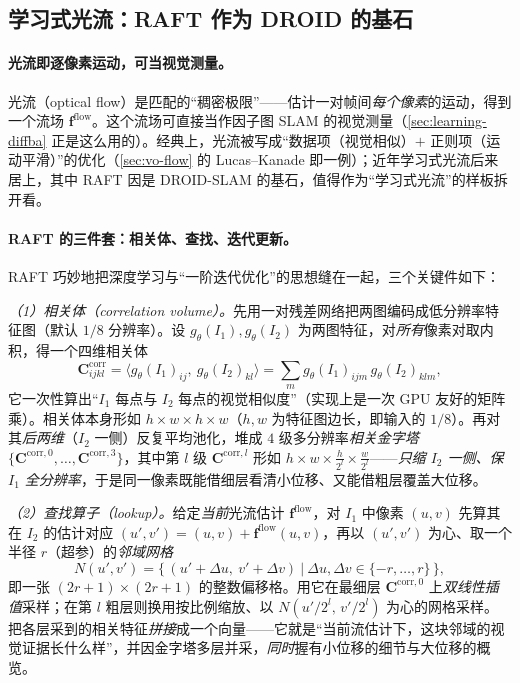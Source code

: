 \subsection{学习式光流：RAFT 作为 DROID 的基石}
\label{sec:learning-flow}

\paragraph{光流即逐像素运动，可当视觉测量。}
光流（optical flow）是匹配的“稠密极限”——估计一对帧间\emph{每个像素}的运动，得到一个流场 $\mathbf{f}^{\mathrm{flow}}$。这个流场可直接当作因子图 SLAM 的视觉测量（\cref{sec:learning-diffba} 正是这么用的）。经典上，光流被写成“数据项（视觉相似）$+$ 正则项（运动平滑）”的优化（\cref{sec:vo-flow} 的 Lucas--Kanade 即一例）；近年学习式光流后来居上，其中 RAFT\cite{teed2020raft} 因是 DROID-SLAM 的基石，值得作为“学习式光流”的样板拆开看。

\paragraph{RAFT 的三件套：相关体、查找、迭代更新。}
RAFT 巧妙地把深度学习与“一阶迭代优化”的思想缝在一起，三个关键件如下\cite{teed2020raft}：

\emph{（1）相关体（correlation volume）。}\;先用一对残差网络把两图编码成低分辨率特征图（默认 $1/8$ 分辨率）。设 $g_\theta(I_1),g_\theta(I_2)$ 为两图特征，对\emph{所有}像素对取内积，得一个四维相关体
\begin{equation}
  \mathbf{C}^{\mathrm{corr}}_{ijkl}
  =\big\langle g_\theta(I_1)_{ij},\ g_\theta(I_2)_{kl}\big\rangle
  =\sum_m g_\theta(I_1)_{ijm}\,g_\theta(I_2)_{klm},
  \label{eq:learn-raft-corr}
\end{equation}
它一次性算出“$I_1$ 每点与 $I_2$ 每点的视觉相似度”（实现上是一次 GPU 友好的矩阵乘）。相关体本身形如 $h\times w\times h\times w$（$h,w$ 为特征图边长，即输入的 $1/8$）。再对其\emph{后两维}（$I_2$ 一侧）反复平均池化，堆成 $4$ 级多分辨率\emph{相关金字塔} $\{\mathbf{C}^{\mathrm{corr},0},\dots,\mathbf{C}^{\mathrm{corr},3}\}$，其中第 $l$ 级 $\mathbf{C}^{\mathrm{corr},l}$ 形如 $h\times w\times \tfrac{h}{2^l}\times\tfrac{w}{2^l}$——\emph{只缩 $I_2$ 一侧、保 $I_1$ 全分辨率}，于是同一像素既能借细层看清小位移、又能借粗层覆盖大位移。

\emph{（2）查找算子（lookup）。}\;给定\emph{当前}光流估计 $\mathbf{f}^{\mathrm{flow}}$，对 $I_1$ 中像素 $(u,v)$ 先算其在 $I_2$ 的估计对应 $(u',v')=(u,v)+\mathbf{f}^{\mathrm{flow}}(u,v)$，再以 $(u',v')$ 为心、取一个半径 $r$（超参）的\emph{邻域网格}
\begin{equation}
  N(u',v')=\big\{\,(u'+\Delta u,\ v'+\Delta v)\ \big|\ \Delta u,\Delta v\in\{-r,\dots,r\}\,\big\},
  \label{eq:learn-raft-lookup}
\end{equation}
即一张 $(2r+1)\times(2r+1)$ 的整数偏移格。用它在最细层 $\mathbf{C}^{\mathrm{corr},0}$ 上\emph{双线性插值}采样；在第 $l$ 粗层则换用按比例缩放、以 $N(u'/2^l,\,v'/2^l)$ 为心的网格采样。把各层采到的相关特征\emph{拼接}成一个向量——它就是“当前流估计下，这块邻域的视觉证据长什么样”，并因金字塔多层并采，\emph{同时}握有小位移的细节与大位移的概览。

